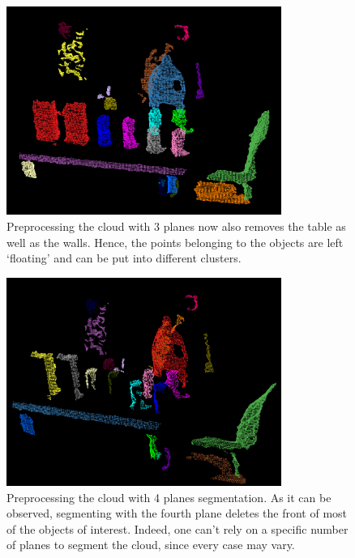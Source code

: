 \documentclass[../main.tex]{subfiles}
\begin{document}
\begin{figure}[htbp]
    \centering
    \includegraphics[width=0.8\textwidth]{images/euclidean_cluster_pre3planes.png}
    \caption{Preprocessing the cloud with 3 planes now also removes the table as well as the walls. Hence, the points belonging to the objects are left `floating' and can be put into different clusters.}
    \label{fig:euclidean_cluster_pre3planes}
\end{figure}

\begin{figure}[htbp]
    \centering
    \includegraphics[width=0.8\textwidth]{images/euclidean_cluster_pre4planes.png}
    \caption{Preprocessing the cloud with 4 planes segmentation. As it can be observed, segmenting with the fourth plane deletes the front of most of the objects of interest. Indeed, one can't rely on a specific number of planes to segment the cloud, since every case may vary.}
    \label{fig:euclidean_cluster_pre4planes}
\end{figure}
\end{document}
